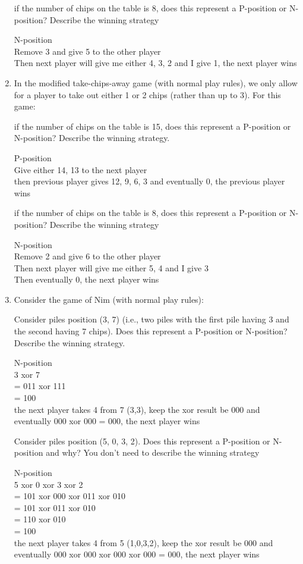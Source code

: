 \documentclass[a4paper]{article}
\begin{document}
\begin{enumerate}
    \subitem if the number of chips on the table is 8, does this represent a P-position or N-position? Describe the winning strategy

    {\normalfont N-position\\
    Remove 3 and give 5 to the other player\\
    Then next player will give me either 4, 3, 2 and I give 1, the next player wins}

    \item  In the modified take-chips-away game (with normal play rules), we only allow for a player to take out either 1 or 2 chips (rather than up to 3). For this game:

    \subitem if the number of chips on the table is 15, does this represent a P-position or N-position? Describe the winning strategy.
    
    {\normalfont P-position\\
    Give either 14, 13 to the next player\\
    then previous player gives 12, 9, 6, 3 and eventually 0, the previous player wins}

    \subitem if the number of chips on the table is 8, does this represent a P-position or N-position? Describe the winning strategy

    {\normalfont N-position\\
    Remove 2 and give 6 to the other player\\
    Then next player will give me either 5, 4 and I give 3\\
    Then eventually 0, the next player wins}

    \item Consider the game of Nim (with normal play rules):

    \subitem Consider piles position (3, 7) (i.e., two piles with the first pile having 3 and the second having 7 chips). Does this represent a P-position or N-position? Describe the winning strategy.

    {\normalfont N-position\\
    3 xor 7 \\= 011 xor 111 \\= 100\\
    the next player takes 4 from 7 (3,3), keep the xor result be 000 and eventually 000 xor 000 = 000, the next player wins}

    \subitem Consider piles position (5, 0, 3, 2). Does this represent a P-position or N-position and why? You don't need to describe the winning strategy

    {\normalfont N-position\\
    5 xor 0 xor 3 xor 2 \\= 101 xor 000 xor 011 xor 010 \\= 101 xor 011 xor 010 \\= 110 xor 010 \\= 100\\
    the next player takes 4 from 5 (1,0,3,2), keep the xor result be 000 and eventually 000 xor 000 xor 000 xor 000 = 000, the next player wins}

\end{enumerate}
\end{document}
